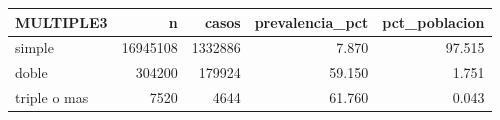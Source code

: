 \begin{tabular}{lrrrr}
\toprule
MULTIPLE3 & n & casos & prevalencia\_pct & pct\_poblacion \\
\midrule
simple & 16945108 & 1332886 & 7.870 & 97.515 \\
doble & 304200 & 179924 & 59.150 & 1.751 \\
triple o mas & 7520 & 4644 & 61.760 & 0.043 \\
\bottomrule
\end{tabular}
